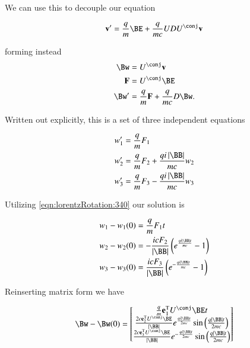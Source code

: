We can use this to decouple our equation

\begin{equation}\label{eqn:lorentzRotation:480}
\Bv' = \frac{q}{m} \BE + \frac{q}{ m c } U D U^\conj \Bv
\end{equation}

forming instead
\begin{align}\label{eqn:lorentzRotation:500}
\Bw &= U^\conj \Bv \\
\BF &= U^\conj \BE \\
\Bw' &= \frac{q}{m} \BF + \frac{q}{ m c } D \Bw.
\end{align}

Written out explicitly, this is a set of three independent equations

\begin{align}\label{eqn:lorentzRotation:520}
w_1' &= \frac{q}{m} F_1 \\
w_2' &= \frac{q}{m} F_2 + \frac{q i \Abs{\BB}}{ m c } w_2 \\
w_3' &= \frac{q}{m} F_3 - \frac{q i \Abs{\BB}}{ m c } w_3
\end{align}

Utilizing \ref{eqn:lorentzRotation:340} our solution is

\begin{align}\label{eqn:lorentzRotation:530}
w_1 - w_1(0) &= \frac{q}{m} F_1 t \\
w_2 - w_2(0) &= - \frac{i c F_2 }{\Abs{\BB}} \left( e^{ \frac{q i \Abs{\BB} t}{ m c } } - 1 \right) \\
w_3 - w_3(0) &= \frac{i c F_3 }{\Abs{\BB}} \left( e^{ -\frac{q i \Abs{\BB} t}{ m c } } - 1 \right)
\end{align}

Reinserting matrix form we have

\begin{equation}\label{eqn:lorentzRotation:540}
\Bw - \Bw(0) =
\begin{bmatrix}
\frac{q}{m} \Be_1^\T U^\conj \BE t \\
\frac{2 c \Be_2^\T U^\conj \BE }{\Abs{\BB}}
e^{ \frac{q i \Abs{\BB} t}{ 2 m c } } \sin \left( \frac{q \Abs{\BB} t}{ 2 m c } \right) \\
\frac{2 c \Be_3^\T U^\conj \BE }{\Abs{\BB}}
e^{ -\frac{q i \Abs{\BB} t}{ 2 m c } } \sin \left( \frac{q \Abs{\BB} t}{ 2 m c } \right) \\
\end{bmatrix}
\end{equation}

